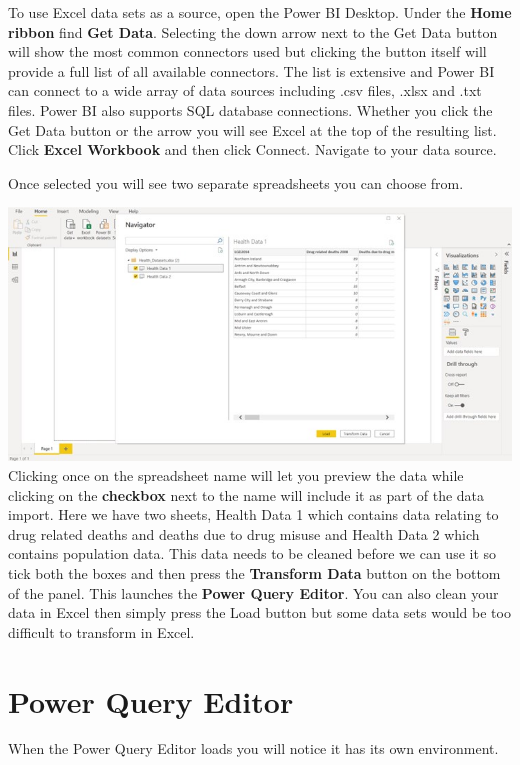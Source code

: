 \documentclass[
]{book}
\begin{document}
To use Excel data sets as a source, open the Power BI Desktop. Under the \textbf{Home ribbon} find \textbf{Get Data}. Selecting the down arrow next to the Get Data button will show the most common connectors used but clicking the button itself will provide a full list of all available connectors. The list is extensive and Power BI can connect to a wide array of data sources including .csv files, .xlsx and .txt files. Power BI also supports SQL database connections. Whether you click the Get Data button or the arrow you will see Excel at the top of the resulting list. Click \textbf{Excel Workbook} and then click Connect. Navigate to your data source.

Once selected you will see two separate spreadsheets you can choose from.

\includegraphics{bi2.jpg}
Clicking once on the spreadsheet name will let you preview the data while clicking on the \textbf{checkbox} next to the name will include it as part of the data import. Here we have two sheets, Health Data 1 which contains data relating to drug related deaths and deaths due to drug misuse and Health Data 2 which contains population data. This data needs to be cleaned before we can use it so tick both the boxes and then press the \textbf{Transform Data} button on the bottom of the panel. This launches the \textbf{Power Query Editor}. You can also clean your data in Excel then simply press the Load button but some data sets would be too difficult to transform in Excel.

\hypertarget{power-query-editor}{%
\section{Power Query Editor}\label{power-query-editor}}

When the Power Query Editor loads you will notice it has its own environment.
\end{document}
